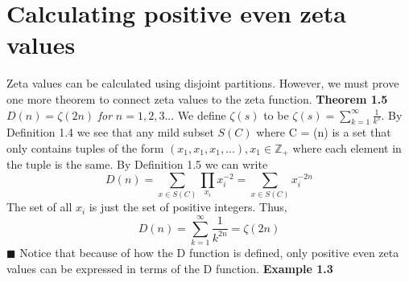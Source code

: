 \documentclass[12pt]{article}
\begin{document}
\section{Calculating positive even zeta values}
Zeta values can be calculated using disjoint partitions. However, we must prove one more theorem to connect zeta values to the zeta function. \newline \newline
\textbf{Theorem 1.5} \(D(n) = \zeta(2n)\)\textit{ for } \(n=1,2,3...\) \newline \newline
We define \(\zeta(s)\) to be \(\zeta(s) = \sum_{k=1}^{\infty}\frac{1}{k^s}\). \newline
By Definition 1.4 we see that any mild subset \(S(C)\) where C = (n) is a set that only contains tuples of the form \((x_1,x_1,x_1,...), x_1\in \mathbb{Z_+}\) where each element in the tuple is the same. \newline
By Definition 1.5 we can write
\[D(n)=\sum_{x\in S(C)}\prod_{x_i}x_i^{-2}=\sum_{x\in S(C)}x_i^{-2n}\]
The set of all \(x_i\) is just the set of positive integers. Thus,
\[D(n)=\sum_{k=1}^{\infty}\frac{1}{k^{2n}}=\zeta(2n)\]
\(\blacksquare\) \newline \newline
Notice that because of how the D function is defined, only positive even zeta values can be expressed in terms of the D function.
\newline \newline
\textbf{Example 1.3} \newline

\newpage
\end{document}
